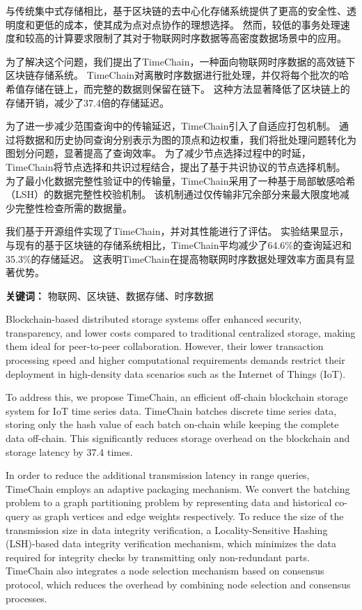 \cleardoublepage
{}
与传统集中式存储相比，基于区块链的去中心化存储系统提供了更高的安全性、透明度和更低的成本，使其成为点对点协作的理想选择。
然而，较低的事务处理速度和较高的计算要求限制了其对于物联网时序数据等高密度数据场景中的应用。

为了解决这个问题，我们提出了TimeChain，一种面向物联网时序数据的高效链下区块链存储系统。
TimeChain对离散时序数据进行批处理，并仅将每个批次的哈希值存储在链上，而完整的数据则保留在链下。
这种方法显著降低了区块链上的存储开销，减少了37.4倍的存储延迟。

为了进一步减少范围查询中的传输延迟，TimeChain引入了自适应打包机制。
通过将数据和历史协同查询分别表示为图的顶点和边权重，我们将批处理问题转化为图划分问题，显著提高了查询效率。
为了减少节点选择过程中的时延，TimeChain将节点选择和共识过程结合，提出了基于共识协议的节点选择机制。
为了最小化数据完整性验证中的传输量，TimeChain采用了一种基于局部敏感哈希（LSH）的数据完整性校验机制。
该机制通过仅传输非冗余部分来最大限度地减少完整性检查所需的数据量。

我们基于开源组件实现了TimeChain，并对其性能进行了评估。
实验结果显示，与现有的基于区块链的存储系统相比，TimeChain平均减少了64.6\%的查询延迟和35.3\%的存储延迟。
这表明TimeChain在提高物联网时序数据处理效率方面具有显著优势。

{\noindent \textbf{关键词：} 物联网、区块链、数据存储、时序数据}

\cleardoublepage
{}
Blockchain-based distributed storage systems offer enhanced security, transparency, and lower costs compared to traditional centralized storage, making them ideal for peer-to-peer collaboration. 
However, their lower transaction processing speed and higher computational requirements demands restrict their deployment in high-density data scenarios such as the Internet of Things (IoT).

To address this, we propose TimeChain, an efficient off-chain blockchain storage system for IoT time series data.
TimeChain batches discrete time series data, storing only the hash value of each batch on-chain while keeping the complete data off-chain. 
This significantly reduces storage overhead on the blockchain and storage latency by 37.4 times. 

In order to reduce the additional transmission latency in range queries, TimeChain employs an adaptive packaging mechanism. 
We convert the batching problem to a graph partitioning problem by representing data and historical co-query as graph vertices and edge weights respectively.
To reduce the size of the transmission size in data integrity verification, a Locality-Sensitive Hashing (LSH)-based data integrity verification mechanism, which minimizes the data required for integrity checks by transmitting only non-redundant parts. 
TimeChain also integrates a node selection mechanism based on consensus protocol, which reduces the overhead by combining node selection and consensus processes.

